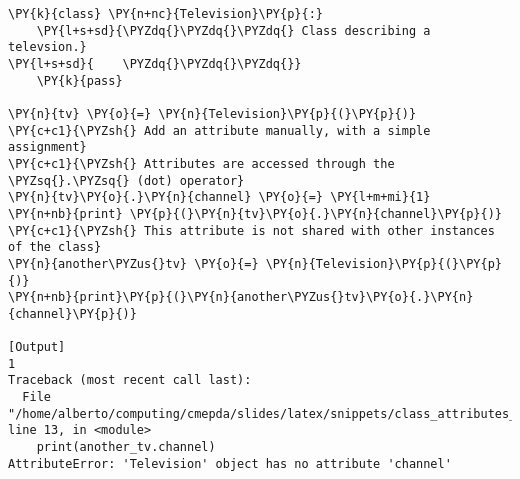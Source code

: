 \begin{Verbatim}[label=\makebox{\url{https://github.com/lucabaldini/cmepda/tree/master/slides/latex/snippets/class\_attributes\_1.py}},commandchars=\\\{\}]
\PY{k}{class} \PY{n+nc}{Television}\PY{p}{:}
    \PY{l+s+sd}{\PYZdq{}\PYZdq{}\PYZdq{} Class describing a televsion.}
\PY{l+s+sd}{    \PYZdq{}\PYZdq{}\PYZdq{}}
    \PY{k}{pass}

\PY{n}{tv} \PY{o}{=} \PY{n}{Television}\PY{p}{(}\PY{p}{)}
\PY{c+c1}{\PYZsh{} Add an attribute manually, with a simple assignment}
\PY{c+c1}{\PYZsh{} Attributes are accessed through the \PYZsq{}.\PYZsq{} (dot) operator}
\PY{n}{tv}\PY{o}{.}\PY{n}{channel} \PY{o}{=} \PY{l+m+mi}{1}
\PY{n+nb}{print} \PY{p}{(}\PY{n}{tv}\PY{o}{.}\PY{n}{channel}\PY{p}{)}
\PY{c+c1}{\PYZsh{} This attribute is not shared with other instances of the class}
\PY{n}{another\PYZus{}tv} \PY{o}{=} \PY{n}{Television}\PY{p}{(}\PY{p}{)}
\PY{n+nb}{print}\PY{p}{(}\PY{n}{another\PYZus{}tv}\PY{o}{.}\PY{n}{channel}\PY{p}{)}

[Output]
1
Traceback (most recent call last):
  File "/home/alberto/computing/cmepda/slides/latex/snippets/class_attributes_1.py", line 13, in <module>
    print(another_tv.channel)
AttributeError: 'Television' object has no attribute 'channel'
\end{Verbatim}